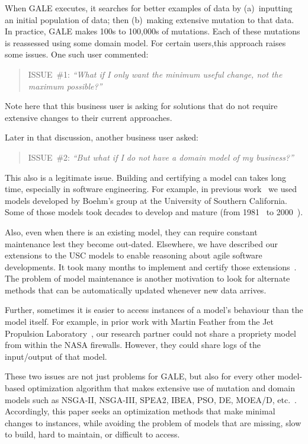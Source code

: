 \documentclass[conference]{IEEEtran}
\begin{document}
When GALE executes, it searches for better examples of data
 by (a)~inputting an initial population of data; then (b)~making
 extensive mutation to that data. In practice, GALE makes
100s to 100,000s of mutations. Each of these mutations
is reassessed using some domain model.
For certain users,this approach raises some issues.  One such user commented:
\begin{quote}
ISSUE~\#1: {\em ``What if I only want the minimum useful change, not
the maximum possible?''}
\end{quote}
Note here that this business user is asking for solutions  that do not require extensive 
changes to their current  approaches. 

Later in that discussion, another business user asked:
\begin{quote}
ISSUE~\#2: {\em ``But what if I do not have a domain model of my business?''}
\end{quote}
This also is a legitimate issue.
Building and certifying a model  can  takes  long time, especially in software engineering. For  example, in previous work~\cite{me07f} we used models
developed by Boehm's group at the University of Southern California.
Some of those models took decades to develop and mature (from 1981~\cite{boehm81} to 2000~\cite{boehm00b}). 

Also, even when there is an existing model, they can require
constant  maintenance lest they become out-dated. Elsewhere, we have described our
extensions to the USC models to enable reasoning about agile software developments. 
It took many months to implement and certify those extensions~\cite{me09i,me09j}.
The problem of model maintenance is another
motivation to look for alternate methods that can be automatically updated whenever new data arrives.

Further, sometimes  it is easier to access instances of a model's behaviour than the model
itself. For example, in prior work with Martin  Feather from the Jet Propulsion 
Laboratory~\cite{fea02a},  our research partner could not share a
propriety model from within the NASA firewalls. However, they could share 
logs of the input/output of that model.
 
These two issues are not just problems for GALE, but also for every
other model-based optimization algorithm  that makes
extensive use of mutation  and domain models such as
NSGA-II, NSGA-III, SPEA2, IBEA, PSO, DE, MOEA/D, etc.~\cite{deb00a,zit02,zit04,%
deb14,Cui2005a,storn97,zhang07:TEC}. Accordingly, this paper seeks
an optimization methods that make minimal changes to instances,
while avoiding the problem of models that are missing, slow
to build, hard to maintain, or difficult to access.
\end{document}
